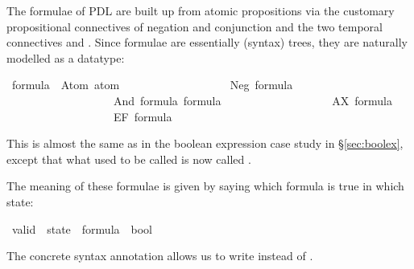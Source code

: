 %
\begin{isabellebody}%
\def\isabellecontext{PDL}%
%
%
\begin{isamarkuptext}%
The formulae of PDL are built up from atomic propositions via the customary
propositional connectives of negation and conjunction and the two temporal
connectives  and . Since formulae are essentially
(syntax) trees, they are naturally modelled as a datatype:%
\end{isamarkuptext}%
\ formula\ {\isacharequal}\ Atom\ atom\isanewline
\ \ \ \ \ \ \ \ \ \ \ \ \ \ \ \ \ \ {\isacharbar}\ Neg\ formula\isanewline
\ \ \ \ \ \ \ \ \ \ \ \ \ \ \ \ \ \ {\isacharbar}\ And\ formula\ formula\isanewline
\ \ \ \ \ \ \ \ \ \ \ \ \ \ \ \ \ \ {\isacharbar}\ AX\ formula\isanewline
\ \ \ \ \ \ \ \ \ \ \ \ \ \ \ \ \ \ {\isacharbar}\ EF\ formula%
\begin{isamarkuptext}%
\noindent
This is almost the same as in the boolean expression case study in
\S\ref{sec:boolex}, except that what used to be called  is now
called .

The meaning of these formulae is given by saying which formula is true in
which state:%
\end{isamarkuptext}%
\ valid\ {\isacharcolon}{\isacharcolon}\ {\isachardoublequote}state\ {\isasymRightarrow}\ formula\ {\isasymRightarrow}\ bool{\isachardoublequote}\ \ \ {\isacharparenleft}{\isachardoublequote}{\isacharparenleft}{\isacharunderscore}\ {\isasymTurnstile}\ {\isacharunderscore}{\isacharparenright}{\isachardoublequote}\ {\isacharbrackleft}{}{}{\isacharcomma}{}{}{\isacharbrackright}\ {}{}{\isacharparenright}%
\begin{isamarkuptext}%
\noindent
The concrete syntax annotation allows us to write  instead of
.


\end{isamarkuptext}
\end{isabellebody}
